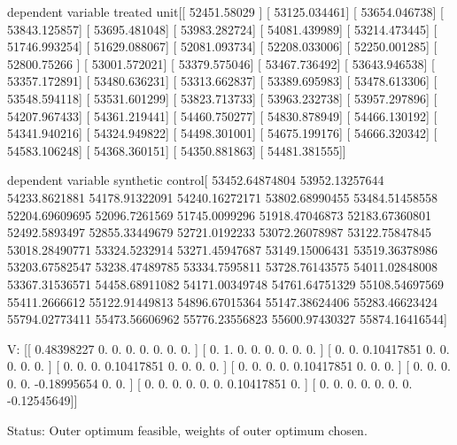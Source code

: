 dependent variable treated unit[[ 52451.58029 ]
 [ 53125.034461]
 [ 53654.046738]
 [ 53843.125857]
 [ 53695.481048]
 [ 53983.282724]
 [ 54081.439989]
 [ 53214.473445]
 [ 51746.993254]
 [ 51629.088067]
 [ 52081.093734]
 [ 52208.033006]
 [ 52250.001285]
 [ 52800.75266 ]
 [ 53001.572021]
 [ 53379.575046]
 [ 53467.736492]
 [ 53643.946538]
 [ 53357.172891]
 [ 53480.636231]
 [ 53313.662837]
 [ 53389.695983]
 [ 53478.613306]
 [ 53548.594118]
 [ 53531.601299]
 [ 53823.713733]
 [ 53963.232738]
 [ 53957.297896]
 [ 54207.967433]
 [ 54361.219441]
 [ 54460.750277]
 [ 54830.878949]
 [ 54466.130192]
 [ 54341.940216]
 [ 54324.949822]
 [ 54498.301001]
 [ 54675.199176]
 [ 54666.320342]
 [ 54583.106248]
 [ 54368.360151]
 [ 54350.881863]
 [ 54481.381555]]

dependent variable synthetic control[ 53452.64874804  53952.13257644  54233.8621881   54178.91322091
  54240.16272171  53802.68990455  53484.51458558  52204.69609695
  52096.7261569   51745.0099296   51918.47046873  52183.67360801
  52492.5893497   52855.33449679  52721.0192233   53072.26078987
  53122.75847845  53018.28490771  53324.5232914   53271.45947687
  53149.15006431  53519.36378986  53203.67582547  53238.47489785
  53334.7595811   53728.76143575  54011.02848008  53367.31536571
  54458.68911082  54171.00349748  54761.64751329  55108.54697569
  55411.2666612   55122.91449813  54896.67015364  55147.38624406
  55283.46623424  55794.02773411  55473.56606962  55776.23556823
  55600.97430327  55874.16416544]

 V:
[[ 0.48398227  0.          0.          0.          0.          0.          0.
   0.        ]
 [ 0.          1.          0.          0.          0.          0.          0.
   0.        ]
 [ 0.          0.          0.10417851  0.          0.          0.          0.
   0.        ]
 [ 0.          0.          0.          0.10417851  0.          0.          0.
   0.        ]
 [ 0.          0.          0.          0.          0.10417851  0.          0.
   0.        ]
 [ 0.          0.          0.          0.          0.         -0.18995654
   0.          0.        ]
 [ 0.          0.          0.          0.          0.          0.
   0.10417851  0.        ]
 [ 0.          0.          0.          0.          0.          0.          0.
  -0.12545649]]

 Status:
Outer optimum feasible, weights of outer optimum chosen.